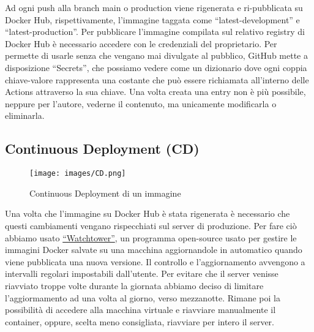 Ad ogni push alla branch main o production viene rigenerata e ri-pubblicata su Docker Hub, rispettivamente, l'immagine taggata come ``latest-development'' e \\ ``latest-production''.
Per pubblicare l'immagine compilata sul relativo registry di Docker Hub è necessario accedere con le credenziali del proprietario. Per permette di usarle senza che vengano mai divulgate al pubblico, GitHub mette a disposizione ``Secrets'', che possiamo vedere come un dizionario dove ogni coppia chiave-valore rappresenta una costante che può essere richiamata all'interno delle Actions attraverso la sua chiave. Una volta creata una entry non è più possibile, neppure per l'autore, vederne il contenuto, ma unicamente modificarla o eliminarla.
\subsection{Continuous Deployment (CD)}
\begin{figure}[h!]
  \centering
  \texttt{[image: images/CD.png]}
  \caption{Continuous Deployment di un immagine}
\end{figure}
Una volta che l'immagine su Docker Hub è stata rigenerata è necessario che questi cambiamenti vengano rispecchiati sul server di produzione. Per fare ciò abbiamo usato  \href{https://containrrr.dev/watchtower/}{``Watchtower''}, un programma open-source usato per gestire le immagini Docker salvate su una macchina aggiornandole in automatico quando viene pubblicata una nuova versione. Il controllo e l'aggiornamento avvengono a intervalli regolari impostabili dall'utente. Per evitare che il server venisse riavviato troppe volte durante la giornata abbiamo deciso di limitare l'aggiormamento ad una volta al giorno, verso mezzanotte. Rimane poi la possibilità di accedere alla macchina virtuale e riavviare manualmente il container, oppure, scelta meno consigliata, riavviare per intero il server.
